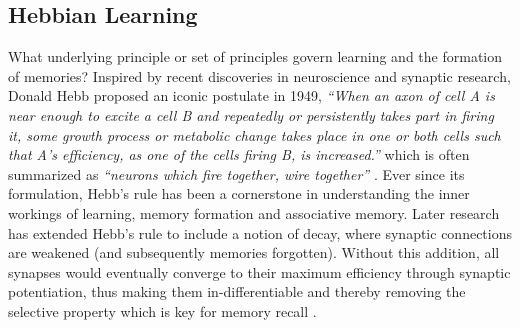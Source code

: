 \subsection{Hebbian Learning}

What underlying principle or set of principles govern learning and the formation of memories? Inspired by recent discoveries in neuroscience and synaptic research, Donald Hebb proposed an iconic postulate in 1949, \textit{``When an axon of cell A is near enough to excite a cell B and repeatedly or persistently takes part in firing it, some growth process or metabolic change takes place in one or both cells such that A's efficiency, as one of the cells firing B, is increased.''} which is often summarized as \textit{``neurons which fire together, wire together''} \cite{hebbs_rule}. Ever since its formulation, Hebb's rule has been a cornerstone in understanding the inner workings of learning, memory formation and associative memory. Later research has extended Hebb's rule to include a notion of decay, where synaptic connections are weakened (and subsequently memories forgotten). Without this addition, all synapses would eventually converge to their maximum efficiency through synaptic potentiation, thus making them in-differentiable and thereby removing the selective property which is key for memory recall \cite{anti_hebbian}.
